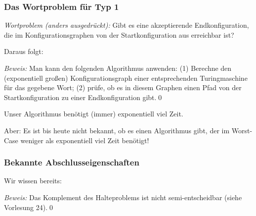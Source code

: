 \documentclass[aspectratio=1610,onlymath]{beamer}
\begin{document}
\begin{frame}\frametitle{Das Wortproblem für Typ 1}

\emph{Wortproblem (anders ausgedrückt):} Gibt es eine akzeptierende
Endkonfiguration, die im Konfigurationsgraphen von der Startkonfiguration aus erreichbar ist?
\medskip\pause

Daraus folgt:\medskip


\emph{Beweis:} Man kann den folgenden Algorithmus anwenden: (1) Berechne den (exponentiell großen) Konfigurationsgraph einer entsprechenden Turingmaschine für das gegebene Wort; (2) prüfe, ob es in diesem Graphen einen Pfad von der Startkonfiguration zu einer Endkonfiguration gibt.\qed
\medskip

Unser Algorithmus benötigt (immer) exponentiell viel Zeit.
\medskip

\alert{Aber:} Es ist bis heute nicht bekannt, ob es einen Algorithmus gibt, der im Worst-Case weniger als exponentiell viel Zeit benötigt!
\bigskip\pause


\end{frame}


\begin{frame}\frametitle{Bekannte Abschlusseigenschaften}

Wir wissen bereits:\medskip

\medskip\pause

\medskip

\emph{Beweis:} Das Komplement des Halteproblems ist nicht semi-entscheidbar (siehe Vorlesung 24).\qed



\end{frame}
\end{document}
